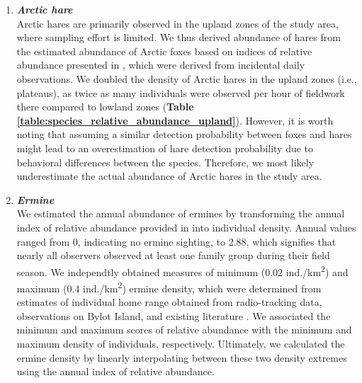 \documentclass[a4paper,twoside,12pt]{article}
\begin{document}
\begin{enumerate}[label=\alph*.]
        	\item[] \textit{\textbf{Arctic hare}}\\
        	Arctic hares are primarily observed in the upland zones of the study area, where sampling effort is limited. We thus derived abundance of hares from the estimated abundance of Arctic foxes based on indices of relative abundance presented in \citep{gauthier2024a}, which were derived from incidental daily observations. We doubled the density of Arctic hares in the upland zones (i.e., plateaus), as twice as many individuals were observed per hour of fieldwork there compared to lowland zones (\textbf{Table \ref{table:species_relative_abundance_upland}}). However, it is worth noting that assuming a similar detection probability between foxes and hares might lead to an overestimation of hare detection probability due to behavioral differences between the species. Therefore, we most likely underestimate the actual abundance of Arctic hares in the study area.
        	
        	\item[] \textit{\textbf{Ermine}}\\
        	We estimated the annual abundance of ermines by transforming the annual index of relative abundance provided in \citet{bolduc2023} into individual density. Annual values ranged from 0, indicating no ermine sighting, to 2.88, which signifies that nearly all observers observed at least one family group during their field season. We independtly obtained measures of minimum (0.02 ind./km\textsuperscript{2}) and maximum (0.4 ind./km\textsuperscript{2}) ermine density, which were determined from estimates of individual home range obtained from radio-tracking data, observations on Bylot Island, and existing literature \citep{legagneux2012, bilodeau2013}. We associated the minimum and maximum scores of relative abundance with the minimum and maximum density of individuals, respectively. Ultimately, we calculated the ermine density by linearly interpolating between these two density extremes using the annual index of relative abundance.
        	

\end{enumerate}
\end{document}

